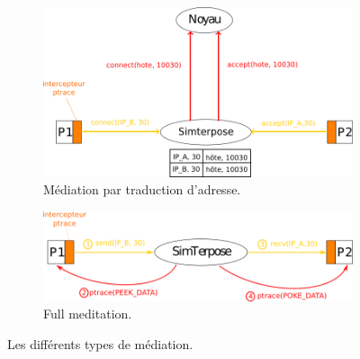\begin{figure}[H]
   \centering
   \begin{subfigure}{0.5\textwidth}
   \includegraphics[scale=0.5]{Pictures/png/Mediation_translation_v2}
   \caption{Médiation par traduction d'adresse.}
   \label{ADDRESS_TRANSLATION}
   \end{subfigure}
   \begin{subfigure}{0.4\textwidth}
     \includegraphics[scale=0.5]{Pictures/png/Mediation_full_v2}
  \caption{Full meditation.}
  \label{FULL_MEDIATION}
   \end{subfigure}
   \caption{Les différents types de médiation.}
   \label{MEDIATION}
 \end{figure}
